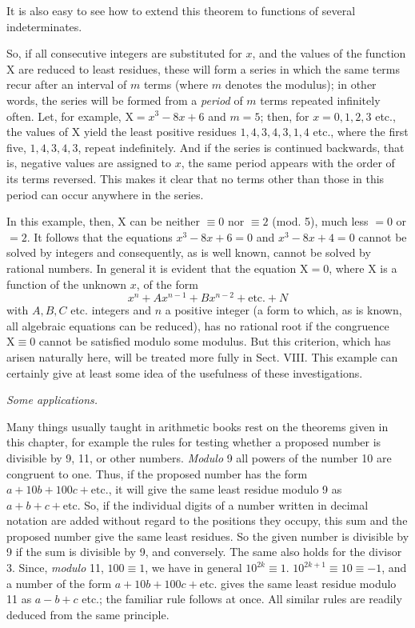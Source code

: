 It is also easy to see how to extend this theorem to functions of several indeterminates.


So, if all consecutive integers are substituted for $x$, and the values of the function $\mathrm{X}$ are reduced to least residues, these will form a series in which the same terms recur after an interval of $m$ terms (where $m$ denotes the modulus); in other words, the series will be formed from a \emph{period} of $m$ terms repeated infinitely often. Let, for example, $\mathrm{X}=x^{3}-8x+6$ and $m=5$; then, for $x=0, 1, 2, 3$ etc., the values of $\mathrm{X}$ yield the least positive residues $1, 4, 3, 4, 3, 1, 4$ etc., where the first five, $1, 4, 3, 4, 3$, repeat indefinitely. And if the series is continued backwards, that is, negative values are assigned to $x$, the same period appears with the order of its terms reversed. This makes it clear that no terms other than those in this period can occur anywhere in the series.


In this example, then, $\mathrm{X}$ can be neither $\equiv 0$ nor $\equiv 2$ (mod. 5), much less $=0$ or $=2$. It follows that the equations $x^{3}-8x+6=0$ and $x^{3}-8x+4=0$ cannot be solved by integers and consequently, as is well known, cannot be solved by rational numbers. In general it is evident that the equation $\mathrm{X}=0$, where $\mathrm{X}$ is a function of the unknown $x$, of the form
\[
x^{n}+Ax^{n-1}+Bx^{n-2}+\text{etc.}+N
\]
with $A, B, C$ etc. integers and $n$ a positive integer (a form to which, as is known, all algebraic equations can be reduced), has no rational root if the congruence $\mathrm{X}\equiv 0$ cannot be satisfied modulo some modulus. But this criterion, which has arisen naturally here, will be treated more fully in Sect. VIII. This example can certainly give at least some idea of the usefulness of these investigations.

\begin{center}\emph{Some applications.}\end{center}

Many things usually taught in arithmetic books rest on the theorems given in this chapter, for example the rules for testing whether a proposed number is divisible by 9, 11, or other numbers. \emph{Modulo} 9 all powers of the number 10 are congruent to one. Thus, if the proposed number has the form $a+10b+100c+\text{etc.}$, it will give the same least residue modulo 9 as $a+b+c+\text{etc.}$ So, if the individual digits of a number written in decimal notation are added without regard to the positions they occupy, this sum and the proposed number give the same least residues. So the given number is divisible by 9 if the sum is divisible by 9, and conversely. The same also holds for the divisor 3. Since, \emph{modulo} 11, $100\equiv 1$, we have in general $10^{2k}\equiv 1$. $10^{2k+1}\equiv 10\equiv -1$, and a number of the form $a+10b+100c+\text{etc.}$ gives the same least residue modulo 11 as $a-b+c$ etc.; the familiar rule follows at once. All similar rules are readily deduced from the same principle.

